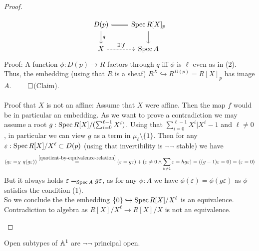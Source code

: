 \begin{proof}
\begin{itemize}
\[\begin{tikzcd}
	{D(p)} & {\Spec R[X]_p} \\
	X & {\Spec A}
	\arrow[Rightarrow, no head, from=1-1, to=1-2]
	\arrow["q", from=1-1, to=2-1]
	\arrow[from=1-2, to=2-2]
	\arrow["{\exists! f}", dashed, from=2-1, to=2-2]
\end{tikzcd}\]
	Proof: A function $\phi : D(p) \to R$ factors through $q$ iff $\phi$ is $\ell$-even as in (2). Thus, the embedding (using that $R$ is a sheaf) $R^X \hookrightarrow R^{D(p)} = R[X]_p$ has image $A$. $\qed$(Claim). 	\\ \\ %
 Proof that $X$ is not an affine:	Assume that $X$ were affine. Then the map $f$ would be in particular an embedding. 
	As we want to prove a contradiction we may assume a root $g : \operatorname{Spec} R[X] / (\sum_{i=0}^{\ell-1} X^i)$. Using that $\sum_{i=0}^{\ell-1} X^i | X^\ell -1 $ and $\ell \neq 0$, in particular we can view $g$ as a term in $\mu_\ell \setminus \{1\}$. Then for any $\varepsilon : \operatorname{Spec} R[X] / X^\ell \subset D(p)$ (using that invertibility is $\lnot \lnot$ stable) we have
	\begin{align*}
	(q\varepsilon =_X q (g \varepsilon)) \overset{\ref{quotient-by-equivalence-relation}}{=} (\varepsilon = g\varepsilon) + (\varepsilon \neq 0 \land \sum_{h \neq 1} \varepsilon = h g \varepsilon) = ((g-1)\varepsilon = 0) = (\varepsilon = 0)
	\end{align*}
	But it always holds $\varepsilon =_{\operatorname{Spec} A} g \varepsilon$, as for any $\phi : A$ we have $\phi(\varepsilon) = \phi(g \varepsilon)$ as $\phi$ satisfies the condition (1). \\
	So we conclude the the embedding $\{0\} \hookrightarrow \operatorname{Spec} R[X] / X^\ell$ is an equivalence. Contradiction to algebra as $R[X] / X^\ell \to R[X] / X$ is not an equivalence.
\end{itemize}
\end{proof}
\begin{lemma}
	Open subtypes of $\mathbb{A}^1$ are $\lnot \lnot$ principal open. %
\end{lemma}
